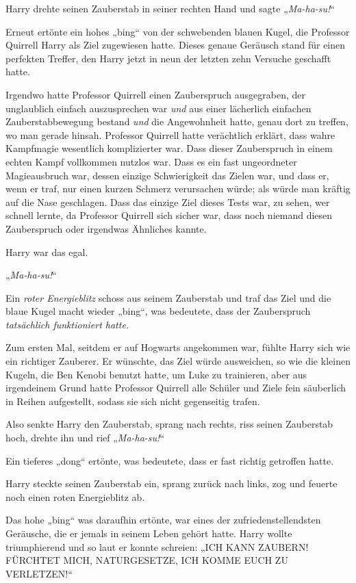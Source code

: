 {\later

Harry drehte seinen Zauberstab in seiner rechten Hand und sagte „\emph{Ma-ha-su!}“

Erneut ertönte ein hohes „bing“ von der schwebenden blauen Kugel, die Professor Quirrell Harry als Ziel zugewiesen hatte. Dieses genaue Geräusch stand für einen perfekten Treffer, den Harry jetzt in neun der letzten zehn Versuche geschafft hatte.

Irgendwo hatte Professor Quirrell einen Zauberspruch ausgegraben, der unglaublich einfach auszusprechen war \emph{und} aus einer lächerlich einfachen Zauberstabbewegung bestand \emph{und} die Angewohnheit hatte, genau dort zu treffen, wo man gerade hinsah. Professor Quirrell hatte verächtlich erklärt, dass wahre Kampfmagie wesentlich komplizierter war. Dass dieser Zauberspruch in einem echten Kampf vollkommen nutzlos war. Dass es ein fast ungeordneter Magieausbruch war, dessen einzige Schwierigkeit das Zielen war, und dass er, wenn er traf, nur einen kurzen Schmerz verursachen würde; als würde man kräftig auf die Nase geschlagen. Dass das einzige Ziel dieses Tests war, zu sehen, wer schnell lernte, da Professor Quirrell sich sicher war, dass noch niemand diesen Zauberspruch oder irgendwas Ähnliches kannte.

Harry war das egal.

„\emph{Ma-ha-su!}“

Ein \emph{roter Energieblitz} schoss aus seinem Zauberstab und traf das Ziel und die blaue Kugel macht wieder „bing“, was bedeutete, dass der Zauberspruch \emph{tatsächlich funktioniert hatte.}

Zum ersten Mal, seitdem er auf Hogwarts angekommen war, fühlte Harry sich wie ein richtiger Zauberer. Er wünschte, das Ziel würde ausweichen, so wie die kleinen Kugeln, die Ben Kenobi benutzt hatte, um Luke zu trainieren, aber aus irgendeinem Grund hatte Professor Quirrell alle Schüler und Ziele fein säuberlich in Reihen aufgestellt, sodass sie sich nicht gegenseitig trafen.

Also senkte Harry den Zauberstab, sprang nach rechts, riss seinen Zauberstab hoch, drehte ihn und rief „\emph{Ma-ha-su!}“

Ein tieferes „dong“ ertönte, was bedeutete, dass er fast richtig getroffen hatte.

Harry steckte seinen Zauberstab ein, sprang zurück nach links, zog und feuerte noch einen roten Energieblitz ab.

Das hohe „bing“ was daraufhin ertönte, war eines der zufriedenstellendsten Geräusche, die er jemals in seinem Leben gehört hatte. Harry wollte triumphierend und so laut er konnte schreien: „ICH KANN ZAUBERN! FÜRCHTET MICH, NATURGESETZE, ICH KOMME EUCH ZU VERLETZEN!“

}
